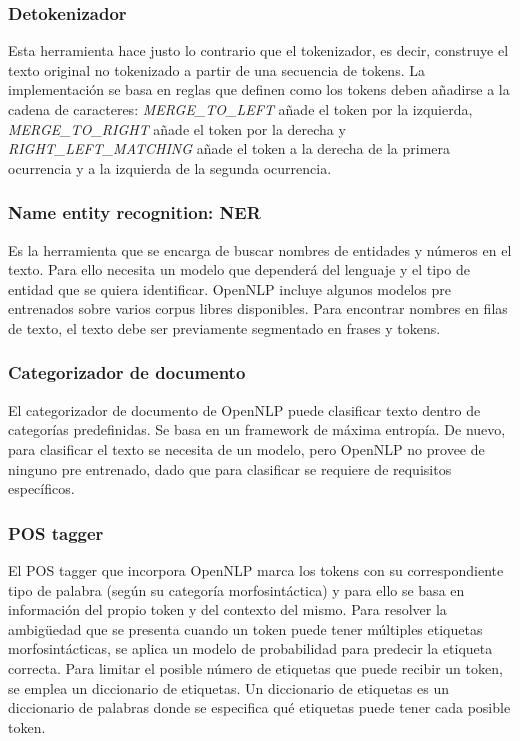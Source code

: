 \subsubsection{Detokenizador}
Esta herramienta hace justo lo contrario que el tokenizador, es decir, construye el texto original no tokenizado a partir de una secuencia de tokens. La implementación se basa en reglas que definen como los tokens deben añadirse a la cadena de caracteres:  \textsl{MERGE\_TO\_LEFT} añade el token por la izquierda, \textsl{MERGE\_TO\_RIGHT} añade el token por la derecha y \textsl{RIGHT\_LEFT\_MATCHING} añade el token a la derecha de la primera ocurrencia y a la izquierda de la segunda ocurrencia.
\subsubsection{Name entity recognition: NER}
Es la herramienta que se encarga de buscar nombres de entidades y números en el texto. Para ello necesita un modelo que dependerá del lenguaje y el tipo de entidad que se quiera identificar. OpenNLP incluye algunos modelos pre entrenados sobre varios corpus libres disponibles. Para encontrar nombres en filas de texto, el texto debe ser previamente segmentado en frases y tokens.  
\subsubsection{Categorizador de documento}
El categorizador de documento de OpenNLP puede clasificar texto dentro de categorías predefinidas. Se basa en un framework de máxima entropía. De nuevo, para clasificar el texto se necesita de un modelo, pero OpenNLP no provee de ninguno pre entrenado, dado que para clasificar se requiere de requisitos específicos. 
\subsubsection{POS tagger}
El POS tagger que incorpora OpenNLP marca los tokens con su correspondiente tipo de palabra (según su categoría morfosintáctica) y para ello se basa en información del propio token y del contexto del mismo. Para resolver la ambigüedad que se presenta cuando un token puede tener múltiples etiquetas morfosintácticas, se aplica un modelo de probabilidad para predecir la etiqueta correcta. Para limitar el posible número de etiquetas que puede recibir un token, se emplea un diccionario de etiquetas. \newline
Un \textsf{diccionario de etiquetas} es un diccionario de palabras donde se especifica qué etiquetas puede tener cada posible token.

